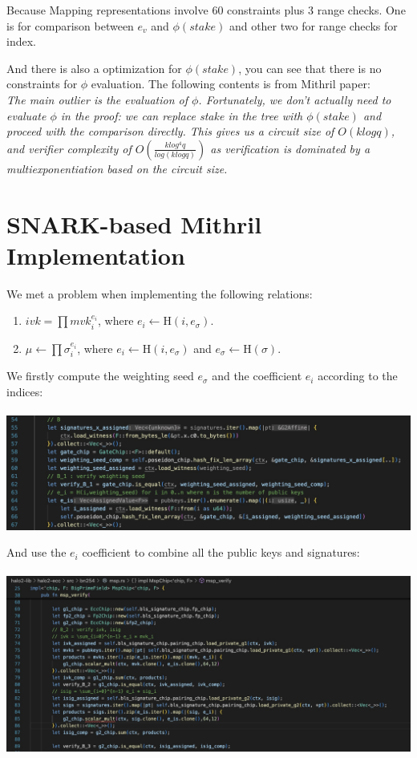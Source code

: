 \documentclass{article}
\begin{document}
Because Mapping representations involve 60 constraints plus 3 range checks. One is for comparison between $e_v$ and $\phi(stake)$ and other two for range checks for index.

And there is also a optimization for $\phi(stake)$, you can see that there is no constraints for $\phi$ evaluation. The following contents is from Mithril paper:
\\

\textit{The main outlier is the evaluation of $\phi$. Fortunately, we don’t actually need to evaluate $\phi$ in the proof: we can replace stake in the tree with $\phi(stake)$ and proceed with the comparison directly. This gives us a circuit size of $O(klogq)$, and verifier complexity of $O(\frac{klog^4q}{log(klogq)})$ as verification is dominated by a multiexponentiation based on the circuit size.}


\section{SNARK-based Mithril Implementation}

We met a problem when implementing the following relations:

\begin{enumerate}
    \item $ivk=\prod mvk_i^{e_i} $, where $e_i \leftarrow \textrm{H}(i,e_\sigma)$.
    \item $\mu \leftarrow \prod \sigma_i^{e_i}$, where $e_i \leftarrow \textrm{H}(i,e_\sigma)$ and $e_\sigma \leftarrow \textrm{H}(\mathbb{\sigma})$.
\end{enumerate}

We firstly compute the weighting seed $e_\sigma$ and the coefficient $e_i$ according to the indices:
\\
\\
\includegraphics[width=1\linewidth]{halo2-lib-ei.jpg}


And use the $e_i$ coefficient to combine all the public keys and signatures:
\\
\\
\includegraphics[width=1\linewidth]{halo2-lib-Bsig-wrong.jpg}
\end{document}
